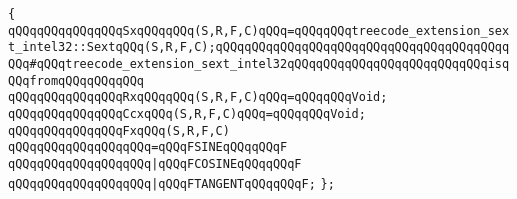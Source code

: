 \verb|{|\newline
\verb|qQQqqQQqqQQqqQQqSxqQQqqQQq(S,R,F,C)qQQq=qQQqqQQqtreecode_extension_sext_intel32::SextqQQq(S,R,F,C);qQQqqQQqqQQqqQQqqQQqqQQqqQQqqQQqqQQqqQQqqQQq#qQQqtreecode_extension_sext_intel32qQQqqQQqqQQqqQQqqQQqqQQqqQQqisqQQqfromqQQqqQQqqQQq|\newline
\verb|qQQqqQQqqQQqqQQqRxqQQqqQQq(S,R,F,C)qQQq=qQQqqQQqVoid;|\newline
\verb|qQQqqQQqqQQqqQQqCcxqQQq(S,R,F,C)qQQq=qQQqqQQqVoid;|\newline
\newline
\verb|qQQqqQQqqQQqqQQqFxqQQq(S,R,F,C)|\newline
\verb|qQQqqQQqqQQqqQQqqQQq=qQQqFSINEqQQqqQQqF|\newline
\verb|qQQqqQQqqQQqqQQqqQQq|\verb#|qQQqFCOSINEqQQqqQQqF#\newline
\verb|qQQqqQQqqQQqqQQqqQQq|\verb#|qQQqFTANGENTqQQqqQQqF;#\newline
\verb|};|\newline
\newline
\newline
\newline

